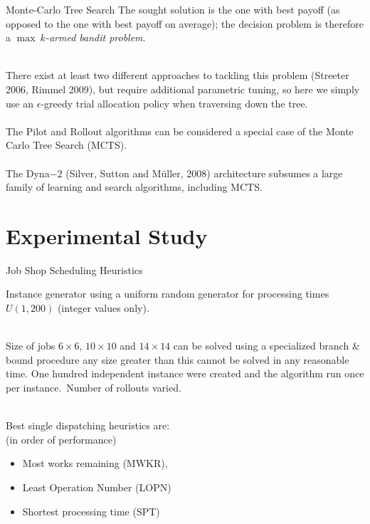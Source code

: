 \documentclass[
	mode=present,
	paper=screen,
	orient=landscape,
	display=slides,
	style=simple
	]{powerdot}
\begin{document}
\begin{slide}{Monte-Carlo Tree Search}
The sought solution is the one with best payoff (as opposed to the one with best
payoff on average); the decision problem is therefore a \emph{$\max~k$-armed bandit problem}.\\
\ \\
\pause

There exist at least two different approaches to tackling this problem (Streeter 2006, Rimmel 2009), but require 
additional parametric tuning, so here we simply use an $\epsilon$-greedy trial allocation policy when traversing down 
the tree.\\ \ \\
\pause
The Pilot and Rollout algorithms can be considered a special case of the Monte Carlo Tree Search (MCTS). \\ \ \\

\pause
The Dyna$-2$ (Silver, Sutton and M\"uller, 2008) architecture subsumes a large family of learning and search 
algorithms, including MCTS.


\end{slide}


\section[slide=false]{Experimental Study}
\begin{slide}{Job Shop Scheduling Heuristics}

Instance generator using a uniform random generator for processing times $U(1,200)$ (integer values only).\\
\ \\

\pause

Size of jobs $6\times 6$, $10\times 10$ and $14\times 14$ can be solved using a specialized branch \& bound procedure 
any size greater than this cannot be solved in any reasonable time. \pause 
One hundred independent instance were created and the algorithm run once per instance.\pause \ Number of rollouts 
varied.\\
\ \\
\pause



Best single dispatching heuristics are:\\ (in order of performance)
\begin{itemize}
\item Most works remaining (MWKR), 
\item Least Operation Number (LOPN)
\item Shortest processing time (SPT)
\end{itemize}



\end{slide}
\end{document}
